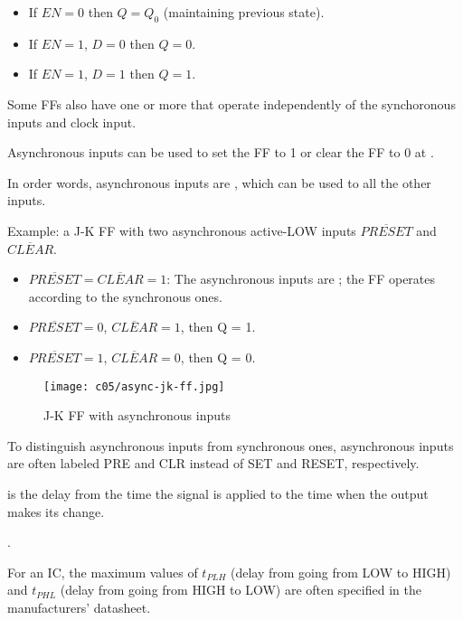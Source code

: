     \begin{itemize}
      \item If $EN = 0$ then $Q = Q_{0}$ (maintaining previous state).
      \item If $EN = 1$, $D = 0$ then $Q = 0$.
      \item If $EN = 1$, $D = 1$ then $Q = 1$.
    \end{itemize}


    \par Some FFs also have one or more  that operate
      independently of the synchoronous inputs and clock input.
    \par Asynchronous inputs can be used to set the FF to 1 or clear the FF
      to 0 at .
    \par In order words, asynchronous inputs are , which
      can be used to  all the other inputs.

    \par Example: a J-K FF with two asynchronous active-LOW inputs
    $\overline{PRESET}$ and $\overline{CLEAR}$.
    \begin{itemize}
      \item $\overline{PRESET} = \overline{CLEAR} = 1$:
        The asynchronous inputs are ; the FF operates according to
        the synchronous ones.
      \item $\overline{PRESET} = 0$, $\overline{CLEAR} = 1$, then Q = 1.
      \item $\overline{PRESET} = 1$, $\overline{CLEAR} = 0$, then Q = 0.
    \end{itemize}
  \begin{figure}[H]
    \centering
    \texttt{[image: c05/async-jk-ff.jpg]}
    \caption{J-K FF with asynchronous inputs}
  \end{figure}

    \par To distinguish asynchronous inputs from synchronous ones,
      asynchronous inputs are often labeled PRE and CLR instead of SET and
      RESET, respectively.



    \par {} is the delay from the time the signal is
    applied to the time when the output makes its change.
    \par {}.
    \par For an IC, the maximum values of $t_{PLH}$ (delay from going from
    LOW to HIGH) and $t_{PHL}$ (delay from going from HIGH to LOW) are often
    specified in the manufacturers' datasheet.

